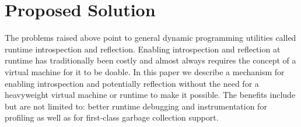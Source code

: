 \section{Proposed Solution}

The problems raised above point to general dynamic programming utilities called
runtime introspection and reflection. Enabling introspection and reflection at
runtime has traditionally been costly and almost always requires the concept of
a virtual machine for it to be doable. In this paper we describe a mechanism for
enabling introspection and potentially reflection without the need for a
heavyweight virtual machine or runtime to make it possible. The benefits include
but are not limited to: better runtime debugging and instrumentation for
profiling as well as for first-class garbage collection support.



